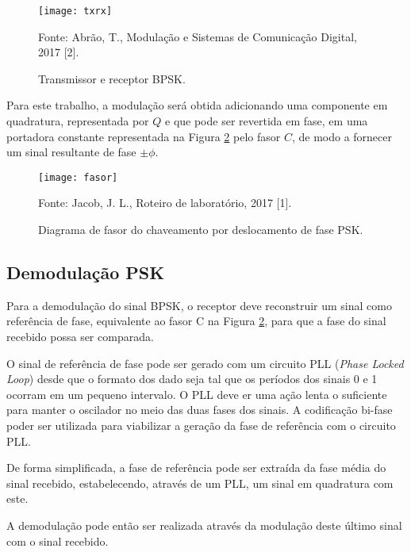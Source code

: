 	\begin{figure}[H]
		\centering
		\caption{Transmissor e receptor BPSK.}
		\texttt{[image: txrx]}
		
		\small Fonte: Abrão, T., Modulação e Sistemas de Comunicação Digital, 2017 [2].
		\label{fig:txrx}
	\end{figure}

Para este trabalho, a modulação será obtida adicionando uma componente em quadratura, representada por $Q$ e que pode ser revertida em fase, em uma portadora constante representada na Figura \ref{fig:fasor} pelo fasor $C$,  de modo a fornecer um sinal resultante de fase $\pm \phi$.

	\begin{figure}[H]
		\centering
		\caption{Diagrama de fasor do chaveamento por deslocamento de fase PSK.}
		\texttt{[image: fasor]}
		
		\small Fonte: Jacob, J. L., Roteiro de laboratório, 2017 [1].
		\label{fig:fasor}
	\end{figure}
	
\subsection{Demodulação PSK}

Para a demodulação do sinal BPSK, o receptor deve reconstruir um sinal como referência de fase, equivalente ao fasor C na Figura \ref{fig:fasor}, para que a fase do sinal recebido possa ser comparada. 

O sinal de referência de fase pode ser gerado com um circuito PLL (\textit{Phase Locked Loop}) desde que o formato dos dado seja tal que os períodos dos sinais 0 e 1 ocorram em um pequeno intervalo. O PLL deve er uma ação lenta o suficiente para manter o oscilador no meio das duas fases dos sinais. A codificação bi-fase poder ser utilizada para viabilizar a geração da fase de referência com o circuito PLL.

De forma simplificada, a fase de referência pode ser extraída da fase média do sinal recebido, estabelecendo, através de um PLL, um sinal em quadratura com este.

A demodulação pode então ser realizada através da modulação deste último sinal com o sinal recebido.